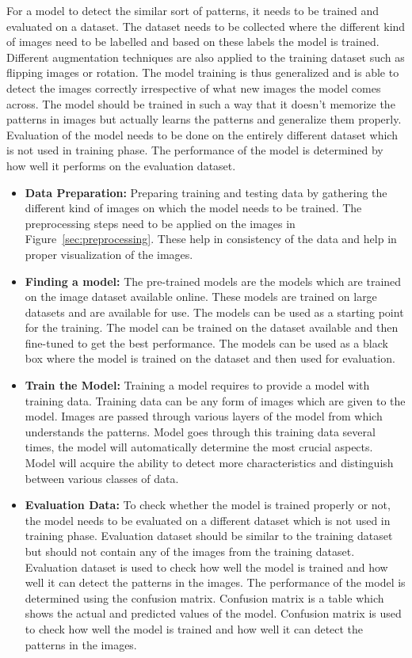 For a model to detect the similar sort of patterns, it needs to be trained and evaluated on a dataset. The dataset needs to be collected where the different kind of images need to be labelled and based on these labels the model is trained. Different augmentation techniques are also applied to the training dataset such as flipping images or rotation. The model training is thus generalized and is able to detect the images correctly irrespective of what new images the model comes across. The model should be trained in such a way that it doesn't memorize the patterns in images but actually learns the patterns and generalize them properly. Evaluation of the model needs to be done on the entirely different dataset which is not used in training phase. The performance of the model is determined by how well it performs on the evaluation dataset.

\begin{itemize} 
    \item \textbf{Data Preparation:} 
    Preparing training and testing data by gathering the different kind of images on which the model needs to be trained. The preprocessing steps need to be applied on the images in Figure~\ref{sec:preprocessing}. These help in consistency of the data and help in proper visualization of the images.

    \item \textbf{Finding a model:} 
    The pre-trained models are the models which are trained on the image dataset available online. These models are trained on large datasets and are available for use. The models can be used as a starting point for the training. The model can be trained on the dataset available and then fine-tuned to get the best performance. The models can be used as a black box where the model is trained on the dataset and then used for evaluation. 

    \item \textbf{Train the Model:} 
    Training a model requires to provide a model with training data. Training data can be any form of images which are given to the model. Images are passed through various layers of the model from which understands the patterns. Model goes through this training data several times, the model will automatically determine the most crucial aspects. Model will acquire the ability to detect more characteristics and distinguish between various classes of data.

    \item \textbf{Evaluation Data:}
    To check whether the model is trained properly or not, the model needs to be evaluated on a different dataset which is not used in training phase. Evaluation dataset should be similar to the training dataset but should not contain any of the images from the training dataset. Evaluation dataset is used to check how well the model is trained and how well it can detect the patterns in the images. The performance of the model is determined using the confusion matrix. Confusion matrix is a table which shows the actual and predicted values of the model. Confusion matrix is used to check how well the model is trained and how well it can detect the patterns in the images. 
\end{itemize}

